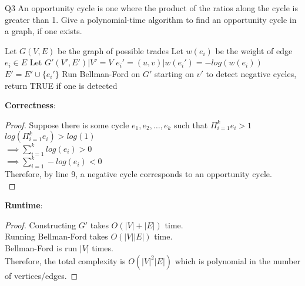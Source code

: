 \begin{problem}
  {Q3}
  An opportunity cycle is one where the product of the ratios along the cycle is greater than 1.
  Give a polynomial-time algorithm to find an opportunity cycle in a graph, if one exists. \\
  \begin{algorithmic}[1]
    \STATE Let $G(V,E)$ be the graph of possible trades
    \STATE Let $w(e_i)$ be the weight of edge $e_i \in E$
    \STATE Let $G'(V', E') | V' = V$
    \STATE $e_i' = (u, v) | w(e_i') = -log(w(e_i))$
    \STATE $E' = E' \cup \{e_i'\}$
    \ENDFOR
    \STATE Run Bellman-Ford on $G'$ starting on $v'$ to detect negative cycles, return TRUE if one is detected
    \ENDFOR
  \end{algorithmic}
  \noindent
  \textbf{Correctness}:
  \begin{proof}
      Suppose there is some cycle $e_1, e_2, \dots, e_k$ such that $\Pi_{i = 1}^{k}e_i > 1$
      $log\left(\Pi_{i = 1}^{k}e_i\right) > log(1)$ \\
      $\implies \sum_{i = 1}^{k} log(e_i) > 0$ \\
      $\implies \sum_{i = 1}^{k} -log(e_i) < 0$ \\
      Therefore, by line 9, a negative cycle corresponds to an opportunity cycle. \\
  \end{proof}
  \noindent
  \textbf{Runtime}:
  \begin{proof}
      Constructing $G'$ takes $O(|V| + |E|)$ time.  \\
      Running Bellman-Ford takes $O(|V||E|)$ time.  \\
      Bellman-Ford is run $|V|$ times. \\
      Therefore, the total complexity is $O(|V|^2|E|)$ which is polynomial in the number of vertices/edges.
  \end{proof}
\end{problem}
